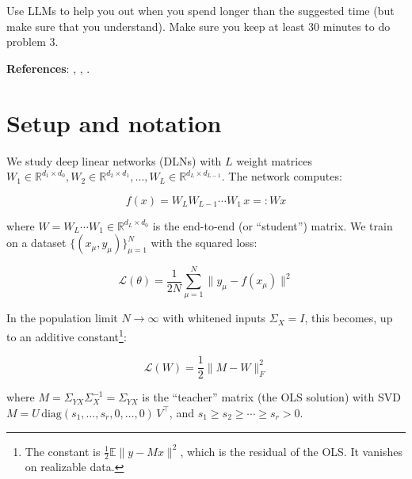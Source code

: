 \documentclass[11pt]{article}
\begin{document}

Use LLMs to help you out when you spend longer than the suggested time (but make sure that you understand). Make sure you keep at least 30 minutes to do problem 3.

\textbf{References}: \cite{saxe2014}, \cite{achour2024}, \cite{tu2024}.

\section{Setup and notation}

We study deep linear networks (DLNs) with \(L\) weight matrices
\(W_1 \in \mathbb{R}^{d_1 \times d_0}, W_2 \in \mathbb{R}^{d_2 \times d_1}, \ldots, W_L \in \mathbb{R}^{d_L \times d_{L-1}}\).
The network computes:

\[f(x) = W_L W_{L-1} \cdots W_1 \, x =: W x\]

where \(W = W_L \cdots W_1 \in \mathbb{R}^{d_L \times d_0}\) is the
end-to-end (or ``student'') matrix. We train on a dataset
\(\{(x_\mu, y_\mu)\}_{\mu=1}^N\) with the squared loss:

\[\mathcal{L}(\theta) = \frac{1}{2N} \sum_{\mu=1}^{N} \|y_\mu - f(x_\mu)\|^2\]

In the population limit \(N \to \infty\) with whitened inputs \(\Sigma_X = I\), this becomes, up to an additive constant\footnote{The constant is \(\frac{1}{2}\mathbb{E}\|y - Mx\|^2\), which is the residual of the OLS. It vanishes on realizable data.}:

\[\mathcal{L}(W) = \frac{1}{2}\|M - W\|_F^2\]

where \(M = \Sigma_{YX} \Sigma_X^{-1} = \Sigma_{YX}\) is the ``teacher'' matrix (the
OLS solution) with SVD
\(M = U \,\text{diag}(s_1, \ldots, s_r, 0, \ldots, 0)\, V^\top\), and
\(s_1 \geq s_2 \geq \cdots \geq s_r > 0\).

%
%
%
%
%
%
\end{document}
